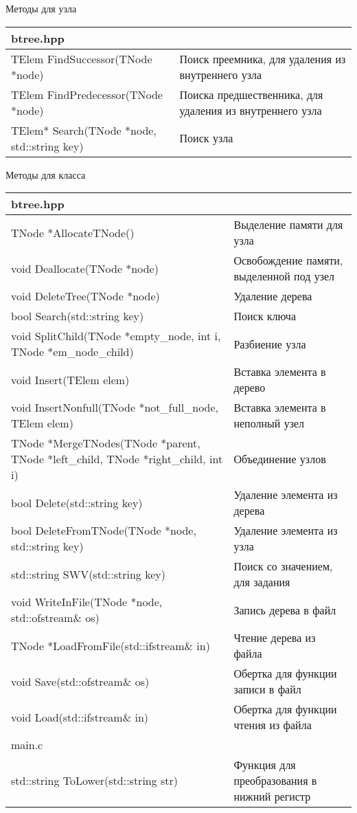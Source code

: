 Методы для узла

\begin{longtable}{|p{7.5cm}|p{7.5cm}|}
\hline
\rowcolor{lightgray}
\multicolumn{2}{|c|} {btree.hpp}\\
\hline
TElem FindSuccessor(TNode *node)&Поиск преемника, для удаления из внутреннего узла\\
\hline
\hline
TElem FindPredecessor(TNode *node)&Поиска предшественника, для удаления из внутреннего узла\\
\hline
\hline
TElem* Search(TNode *node, std::string key)&Поиск узла\\
\hline
\end{longtable}


Методы для класса
\begin{longtable}{|p{7.5cm}|p{7.5cm}|}
\hline
\rowcolor{lightgray}
\multicolumn{2}{|c|} {btree.hpp}\\
\hline
TNode *AllocateTNode()&Выделение памяти для узла\\
\hline
\hline
void Deallocate(TNode *node)&Освобождение памяти, выделенной под узел\\
\hline
\hline
void DeleteTree(TNode *node)&Удаление дерева\\
\hline
\hline
bool Search(std::string key)&Поиск ключа\\
\hline
\hline
void SplitChild(TNode *empty{\_}node, int i, TNode *em{\_}node{\_}child)&Разбиение узла\\
\hline
\hline
void Insert(TElem elem)&Вставка элемента в дерево\\
\hline
\hline
void InsertNonfull(TNode *not{\_}full{\_}node, TElem elem)&Вставка элемента в неполный узел\\
\hline
\hline
TNode *MergeTNodes(TNode *parent, TNode *left{\_}child, TNode *right{\_}child, int i)&Объединение узлов\\
\hline
\hline
bool Delete(std::string key)&Удаление элемента из дерева\\
\hline
\hline
bool DeleteFromTNode(TNode *node, std::string key)&Удаление элемента из узла\\
\hline
\hline
std::string SWV(std::string key)&Поиск со значением, для задания\\
\hline
\hline
void WriteInFile(TNode *node, std::ofstream{\&} os)&Запись дерева в файл\\
\hline
\hline
TNode *LoadFromFile(std::ifstream{\&} in)&Чтение дерева из файла\\
\hline
\hline
void Save(std::ofstream{\&} os)&Обертка для функции записи в файл\\
\hline
\hline
void Load(std::ifstream{\&} in)&Обертка для функции чтения из файла\\
\hline
\rowcolor{lightgray}
\multicolumn{2}{|c|} {main.c}\\
\hline
std::string ToLower(std::string str)&Функция для преобразования в нижний регистр\\
\hline
\end{longtable}


